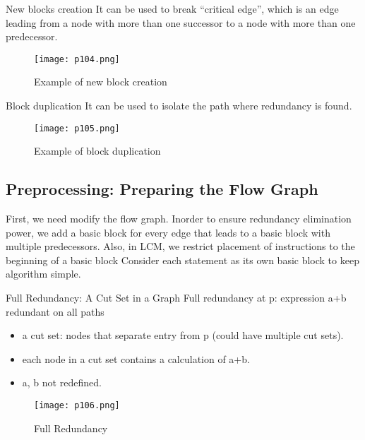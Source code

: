 \begin{definition}{New blocks creation}
	It can be used to break {\color{red}“critical edge”},
	which is an edge leading from a node with more than one
	successor to a node with more than one predecessor.
	\begin{figure}[H]
		\centering
		\texttt{[image: p104.png]}
		\caption{Example of new block creation}
		\label{fig:p104}
	\end{figure}

\end{definition}

\begin{definition}{Block duplication}
	It can be used to isolate the path where
	redundancy is found.
	\begin{figure}[H]
		\centering
		\texttt{[image: p105.png]}
		\caption{Example of block duplication}
		\label{fig:p105}
	\end{figure}

\end{definition}


\subsection{Preprocessing: Preparing the Flow Graph}

First, we need modify the flow graph. Inorder to ensure redundancy elimination power, we add
a basic block for every edge that leads to a basic block with multiple
predecessors. Also, in LCM, we restrict placement of instructions to the beginning of a basic block
Consider each statement as its own basic block to keep algorithm simple.


\begin{definition}{Full Redundancy: A Cut Set in a Graph}
	Full redundancy at p: expression a+b redundant on all paths
	\begin{itemize}
		\item a cut set: nodes that separate entry from p (could have multiple cut sets).
		\item each node in a cut set contains a calculation of a+b.
		\item a, b not redefined.
	\end{itemize}

	\begin{figure}[H]
		\centering
		\texttt{[image: p106.png]}
		\caption{Full Redundancy}
		\label{fig:p106}
	\end{figure}
\end{definition}



